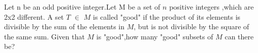 Let n be an odd positive integer.Let M be a set of $n$ positive integers ,which are 2x2 different. A set $T$ $\in$ $M$ is called "good" if the product of its elements is divisible by the sum of the elements in $M$, but is not divisible by the square of the same sum. Given that $M$ is "good",how many "good" subsets of $M$ can there be?
